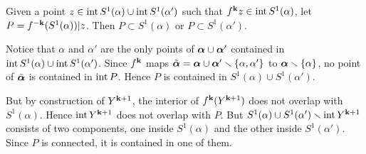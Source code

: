 \msk

\begin{lem}\label{qn-pullbacks}
  Given a point $z\in \operatorname{int} S^1(\alpha)\cup \operatorname{int} S^1(\alpha')$ such that $f^{{\mathbf{k}}} z \in\operatorname{int} S^1(\alpha)$,
let $P = f^{-{\mathbf{k}}}(S^1(\alpha))|z$.  Then $P\subset S^1(\alpha)$ or $P\subset S^1(\alpha')$.
\end{lem}

\begin{pf}
  Notice that $\alpha$ and $\alpha'$ are the only points of ${\mbox{\boldmath$\alpha$} }\cup {\mbox{\boldmath$\alpha$} }'$ 
contained in $\operatorname{int} S^1(\alpha)\cup \operatorname{int} S^1(\alpha')$.
Since $f^{{\mathbf{k}}}$ maps $\tilde{{\mbox{\boldmath$\alpha$} }}={\mbox{\boldmath$\alpha$} }\cup {\mbox{\boldmath$\alpha$} }'\smallsetminus \{\alpha, \alpha'\}$
to ${\mbox{\boldmath$\alpha$} }\smallsetminus \{\alpha\}$,
no point of $\tilde{{\mbox{\boldmath$\alpha$} }}$ is contained in $\operatorname{int} P$.
Hence $P$ is contained in $ S^1(\alpha)\cup  S^1(\alpha')$.

But by construction of $Y^{{\mathbf{k}}+1}$, the interior of $f^{\mathbf{k}} (Y^{{\mathbf{k}}+1})$ does not overlap with $S^1(\alpha)$.
Hence $\operatorname{int} Y^{{\mathbf{k}}+1}$ does not overlap with $P$. 
But $S^1(\alpha)\cup S^1(\alpha')\smallsetminus  \operatorname{int} Y^{{\mathbf{k}} +1}$ 
consists of two components, one inside $S^1(\alpha)$ and the other inside $S^1(\alpha')$. 
Since $P$ is connected, it is contained in one of them.
\end{pf}

